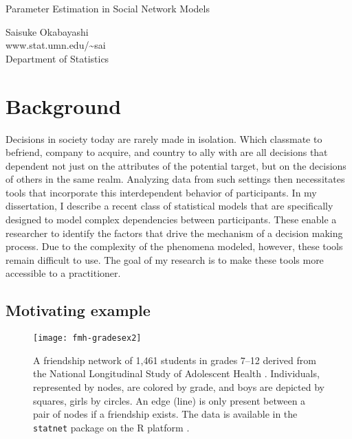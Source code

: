 \documentclass[12pt]{article}
\begin{document}
\begin{center}
{\normalsize{Parameter Estimation in Social Network Models}} 

\vspace{0.15in}
{Saisuke Okabayashi} \\
www.stat.umn.edu/\textasciitilde sai\\
{Department of Statistics}\\
\end{center}


\section{Background}
Decisions in society today are rarely made in isolation.  Which classmate 
to befriend, company to acquire, and 
country to ally with are all decisions that dependent not just on the 
attributes of the potential target, but on the decisions of others 
in the same realm.  Analyzing
data from such settings then necessitates tools that incorporate 
this interdependent behavior of participants.  
In my dissertation, I describe a recent class of statistical models 
that are specifically designed to model complex dependencies between participants.
These enable a researcher to identify the 
factors that drive the mechanism of a decision making process.  Due to
the complexity of the phenomena modeled, however, these tools remain difficult
to use.  
The goal of my research is to make these tools more accessible to a practitioner.




\subsection{Motivating example}
\begin{figure}[h!]
\centering
\texttt{[image: fmh-gradesex2]}
\caption{A friendship network of 1,461 students in grades 7--12 derived 
from the National Longitudinal Study of Adolescent Health \citep{Resnick:1997}.  
Individuals, represented by nodes, are colored by grade, and boys
are depicted by squares, girls by circles.  An edge (line) is only present between a pair of 
nodes if a friendship exists.  The data is available in the 
\texttt{statnet} package \citep{statnet:R} on the R platform \citep{R}.}
\label{F:fmh}
\end{figure}
\end{document}
